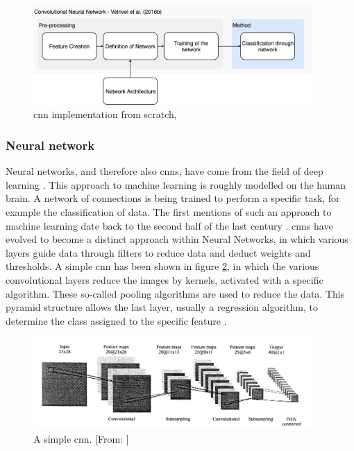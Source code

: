 \begin{figure}[!h]
	\centering
	\captionsetup{justification=raggedright,singlelinecheck=false}
	\includegraphics[width=0.95\textwidth]{figs/vet2.png}
	\caption{\footnotesize{\ac{cnn} implementation from scratch, \citet{Vetrivel2016b}}}
	\label{fig:vet2}
\end{figure}

\subsubsection*{Neural network}
Neural networks, and therefore also \ac{cnn}s, have come from the field of deep learning \citep{Hardesty2017}. This approach to machine learning is roughly modelled on the human brain. A network of connections is being trained to perform a specific task, for example the classification of data. The first mentions of such an approach to machine learning date back to the second half of the last century \citep{Lawrence1997, Hardesty2017}. \ac{cnn}s have evolved to become a distinct approach within Neural Networks, in which various layers guide data through filters to reduce data and deduct weights and thresholds. A simple \ac{cnn} has been shown in figure \ref{fig:NN}, in which the various convolutional layers reduce the images by kernels, activated with a specific algorithm. These so-called pooling algorithms are used to reduce the data. This pyramid structure allows the last layer, usually a regression algorithm, to determine the class assigned to the specific feature \citep{Lawrence1997}.

\begin{figure}[!h]
	\centering
	\captionsetup{justification=raggedright,singlelinecheck=false}
	\includegraphics[width=0.95\textwidth]{figs/nn.png}
	\caption{\footnotesize{A simple \ac{cnn}. [From: \citet{Lawrence1997}]}}
	\label{fig:NN}
\end{figure}

